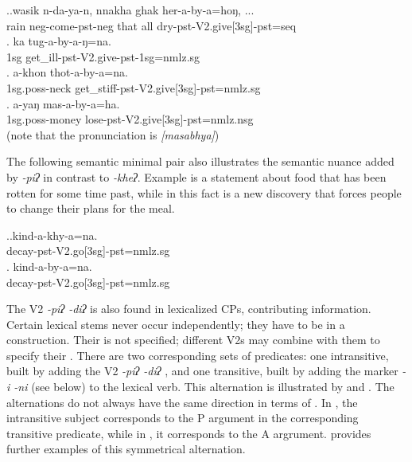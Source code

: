 \ex.\ag.wasik n-da-ya-n, nnakha ghak her-a-by-a=hoŋ, ...\\
rain {\sc neg-}come{\sc [3sg]-pst-neg} that all dry{\sc -pst-V2.give[3sg]-pst=seq}\\
\bg. ka tug-a-by-a-ŋ=na.\\
{\sc 1sg} get\_ill{\sc -pst-V2.give-pst-1sg=nmlz.sg}\\
\bg. a-khon thot-a-by-a=na.\\
{\sc 1sg.poss-}neck get\_stiff{\sc -pst-V2.give[3sg]-pst=nmlz.sg}\\
\bg. a-yaŋ mas-a-by-a=ha.\\
{\sc 1sg.poss-}money lose{\sc -pst-V2.give[3sg]-pst=nmlz.nsg}\\
 (note that the pronunciation is \emph{[masa\-bhya]})


The following semantic minimal pair also illustrates the semantic nuance added by  \emph{-piʔ} in contrast to \emph{-kheʔ}. Example \Next[a] is a  statement about  food that has been rotten for some time past, while in \Next[b] this fact is a new discovery that forces people to change their plans for the meal.

\ex.\ag.kind-a-khy-a=na.\\
decay{\sc -pst-V2.go[3sg]-pst=nmlz.sg}\\
\bg. kind-a-by-a=na.\\
decay{\sc -pst-V2.go[3sg]-pst=nmlz.sg} \\


The V2 \emph{-piʔ  \ti -diʔ} is also found in lexicalized CPs, contributing  information. Certain lexical stems never occur independently; they have to be in a  construction. Their  is not specified; different  V2s may combine with them to specify their . There are two  corresponding sets of predicates: one intransitive, built by adding the V2 \emph{-piʔ  \ti -diʔ} , and one transitive, built by adding the marker \emph{-i \ti -ni}  (see  below) to the lexical verb. This alternation is illustrated by \Next and \NNext. The alternations do not always have  the same direction in terms of . In \Next, the intransitive subject corresponds to the P argument in the corresponding transitive predicate, while in \NNext, it corresponds to the A argrument.  provides further examples of this symmetrical alternation.


